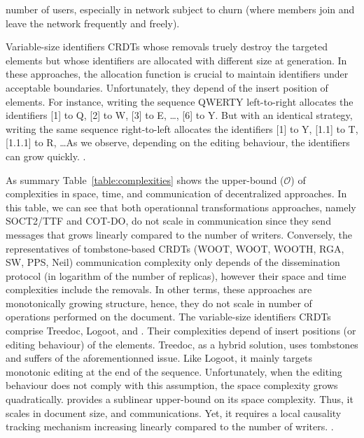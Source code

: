 \begin{asparadesc}
  number of users, especially in network subject to churn (where members join
  and leave the network frequently and freely).
\item [Variable-size identifiers] CRDTs whose removals truely destroy the
  targeted elements but whose identifiers are allocated with different size at
  generation. In these approaches, the allocation function is crucial to
  maintain identifiers under acceptable boundaries. Unfortunately, they depend
  of the insert position of elements. For instance, writing the sequence QWERTY
  left-to-right allocates the identifiers [1] to Q, [2] to W, [3] to E, \ldots,
  [6] to Y. But with an identical strategy, writing the same sequence
  right-to-left allocates the identifiers [1] to Y, [1.1] to T, [1.1.1] to R,
  \ldots As we observe, depending on the editing behaviour, the identifiers
  can grow quickly. .
\item [As summary] Table~\ref{table:complexities} shows the upper-bound
  ($\mathcal{O}$) of complexities in space, time, and communication of
  decentralized approaches. In this table, we can see that both operationnal
  transformations approaches, namely SOCT2/TTF and COT-DO, do not scale in
  communication since they send messages that grows linearly compared to the
  number of writers. Conversely, the representatives of tombstone-based CRDTs
  (WOOT, WOOT, WOOTH, RGA, SW, PPS, Neil) communication complexity only depends
  of the dissemination protocol (in logarithm of the number of replicas),
  however their space and time complexities include the removals. In other
  terms, these approaches are monotonically growing structure, hence, they do
  not scale in number of operations performed on the document. The variable-size
  identifiers CRDTs comprise Treedoc, Logoot, and \LSEQ. Their complexities
  depend of insert positions (or editing behaviour) of the elements. Treedoc, as
  a hybrid solution, uses tombstones and suffers of the aforementionned
  issue. Like Logoot, it mainly targets monotonic editing at the end of the
  sequence. Unfortunately, when the editing behaviour does not comply with this
  assumption, the space complexity grows quadratically. \LSEQ provides a
  sublinear upper-bound on its space complexity. Thus, it scales in document
  size, and communications. Yet, it requires a local causality tracking
  mechanism increasing linearly compared to the number of
  writers. .
\end{asparadesc}

